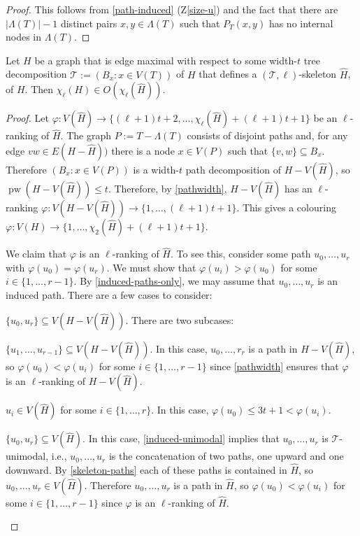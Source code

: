 \documentclass[kpfonts]{patmorin}
\DeclareMathOperator{\pw}{pw}
\newcommand{\trn}{\chi_2}
\newcommand{\lrn}{\chi_{\ell}}
\theoremstyle{named}
\begin{document}
\begin{proof}
    This follows from \cref{path-induced} (Z\ref{size-u}) and the fact that there are $|\Lambda(T)|-1$ distinct pairs $x,y\in\Lambda(T)$ such that $P_T(x,y)$ has no internal nodes in $\Lambda(T)$.
\end{proof}


\begin{lem}\label{skeleton-colour}
    Let $H$ be a graph that is edge maximal with respect to some width-$t$ tree decomposition $\mathcal{T}:=(B_x:x\in V(T))$ of $H$ that defines a $(\mathcal{T},\ell)$-skeleton $\hat{H}$, of $H$.  Then $\lrn(H)\in O(\lrn(\hat{H}))$.
\end{lem}

\begin{proof}
    Let $\varphi:V(\hat{H})\to \{(\ell+1)t+2,\ldots,\lrn(\hat{H})+(\ell+1)t+1\}$ be an $\ell$-ranking of $\hat{H}$. The graph $P:=T-\Lambda(T)$ consists of disjoint paths and, for any edge $vw\in E(H-\hat{H}))$ there is a node $x\in V(P)$ such that $\{v,w\}\subseteq B_x$.  Therefore $(B_x:x\in V(P))$ is a width-$t$ path decomposition of $H-V(\hat{H})$, so $\pw(H-V(\hat{H}))\le t$.  Therefore, by \cref{pathwidth}, $H-V(\hat{H})$ has an $\ell$-ranking $\varphi:V(H-V(\hat{H}))\to\{1,\ldots,(\ell+1)t+1\}$.  This gives a colouring $\varphi: V(H)\to\{1,\ldots,\trn(\hat{H})+(\ell+1)t+1\}$.

    We claim that $\varphi$ is an $\ell$-ranking of $\hat{H}$.  To see this, consider some path $u_0,\ldots,u_r$ with $\varphi(u_0)=\varphi(u_r)$.  We must show that $\varphi(u_i)>\varphi(u_0)$ for some $i\in\{1,\ldots,r-1\}$.
    By \cref{induced-paths-only}, we may assume that $u_0,\ldots,u_r$ is an induced path. There are a few cases to consider:
    \begin{compactenum}
        \item $\{u_0,u_r\}\subseteq V(H-V(\hat{H}))$. There are two subcases:
        \begin{compactenum}
            \item $\{u_1,\ldots,u_{r-1}\}\subseteq V(H-V(\hat{H}))$.  In this case, $u_0,\ldots,r_r$ is a path in $H-V(\hat{H})$, so  $\varphi(u_0)<\varphi(u_i)$ for some $i\in\{1,\ldots,r-1\}$ since \cref{pathwidth} ensures that $\varphi$ is an $\ell$-ranking of $H-V(\hat{H})$.

            \item $u_i\in V(\hat{H})$ for some $i\in\{1,\ldots,r\}$. In this case, $\varphi(u_0)\le 3t+1 < \varphi(u_i)$.
        \end{compactenum}
        \item $\{u_0,u_r\}\subseteq V(\hat{H})$. In this case, \cref{induced-unimodal} implies that $u_0,\ldots,u_r$ is $\mathcal{T}$-unimodal, i.e., $u_0,\ldots,u_r$ is the concatenation of two paths, one upward and one downward.  By \cref{skeleton-paths} each of these paths is contained in $\hat{H}$, so $u_0,\ldots,u_r\in V(\hat{H})$.
        Therefore $u_0,\ldots,u_r$ is a path in $\hat{H}$, so  $\varphi(u_0)<\varphi(u_i)$ for some $i\in\{1,\ldots,r-1\}$ since $\varphi$ is an $\ell$-ranking of $\hat{H}$. \qedhere
    \end{compactenum}
\end{proof}
\end{document}
